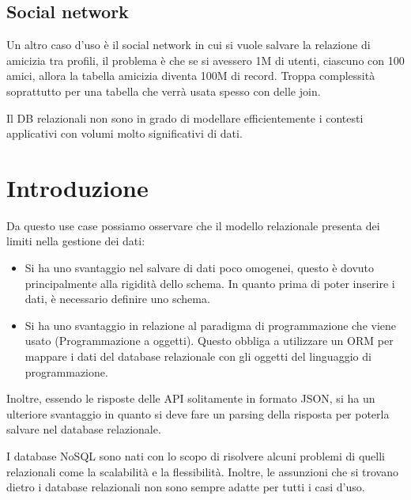 \subsection*{Social network}
Un altro caso d'uso è il social network in cui si vuole salvare la relazione di
amicizia tra profili, il problema è che se si avessero 1M di utenti, ciascuno con
100 amici, allora la tabella amicizia diventa 100M di record. Troppa complessità
soprattutto per una tabella che verrà usata spesso con delle join.

Il DB relazionali non sono in grado di modellare efficientemente i contesti applicativi
con volumi molto significativi di dati.
\section{Introduzione}
Da questo use case possiamo osservare che il modello relazionale presenta dei
limiti nella gestione dei dati:
\begin{itemize}
    \item Si ha uno svantaggio nel salvare di dati poco omogenei, questo è dovuto
          principalmente alla rigidità dello schema. In quanto prima di poter
          inserire i dati, è necessario definire uno schema.
    \item Si ha uno svantaggio in relazione al paradigma di programmazione che
          viene usato (Programmazione a oggetti). Questo obbliga a utilizzare
          un ORM per mappare i dati del database relazionale con gli oggetti
          del linguaggio di programmazione.
\end{itemize}
Inoltre, essendo le risposte delle API solitamente in formato JSON, si ha un
ulteriore svantaggio in quanto si deve fare un parsing della risposta per
poterla salvare nel database relazionale.

I database NoSQL sono nati con lo scopo di risolvere alcuni problemi di quelli
relazionali come la scalabilità e la flessibilità. Inoltre, le assunzioni che
si trovano dietro i database relazionali non sono sempre adatte per tutti i
casi d'uso.

